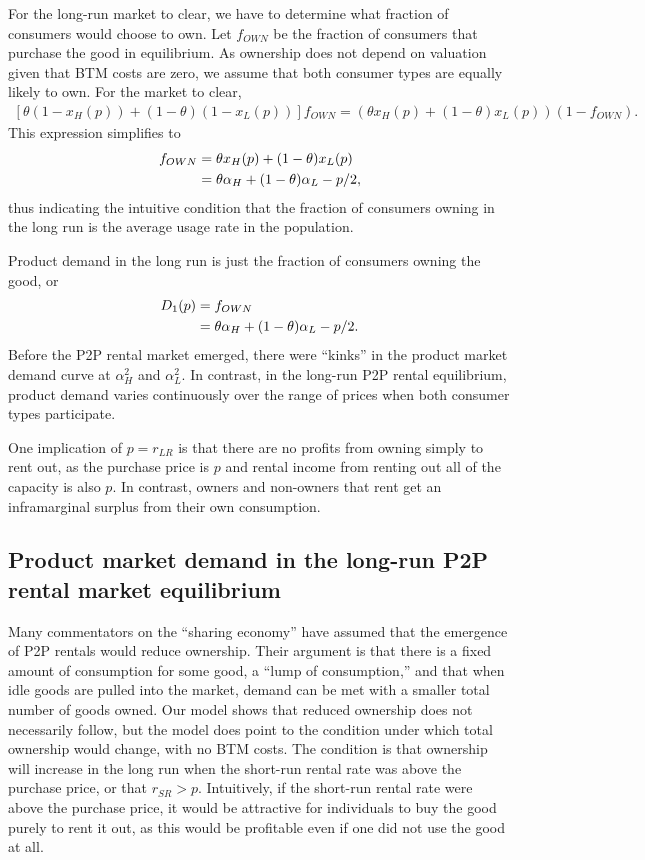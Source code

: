 \documentclass[11pt]{article}
\begin{document}
For the long-run market to clear, we have to determine what fraction of consumers would choose to own. 
Let $f_{OWN}$ be the fraction of consumers that purchase the good in equilibrium. 
As ownership does not depend on valuation given that BTM costs are zero, we assume that both consumer types are equally likely to own. 
For the market to clear, 
\begin{align}
\left[ \theta (1-x_H(p)) + (1-\theta)(1-x_L(p))\right]f_{OWN} = \left(\theta x_H(p) + (1-\theta)x_L(p) \right)(1- f_{OWN}). 
\end{align} 
This expression simplifies to 
\begin{align}
  f_{OWN} &= \theta x_H(p) + (1-\theta)x_L(p) \notag \\
         &= \theta \alpha_H + (1 - \theta) \alpha_L- p/2,
\end{align} 
thus indicating the intuitive condition that the fraction of consumers owning in the long run is the average usage rate in the population.  

Product demand in the long run is just the fraction of consumers owning the good, or 
\begin{align}
D_1(p) &= f_{OWN} \notag \\  
     &= \theta \alpha_H + (1-\theta) \alpha_L - p/2.  
\end{align} 
Before the P2P rental market emerged, there were ``kinks'' in the product market demand curve at $\alpha_H^2$ and $\alpha_L^2$. 
In contrast, in the long-run P2P rental equilibrium, product demand varies continuously over the range of prices when both consumer types participate.

One implication of $p = r_{LR}$ is that there are no profits from owning simply to rent out, as the purchase price is $p$ and rental income from renting out all of the capacity is also $p$.  
In contrast, owners and non-owners that rent get an inframarginal surplus from their own consumption. 

\subsection{Product market demand in the long-run P2P rental market equilibrium} 

Many commentators on the ``sharing economy'' have assumed that the emergence of P2P rentals would reduce ownership. 
Their argument is that there is a fixed amount of consumption for some good, a ``lump of consumption,'' and that when idle goods are pulled into the market, demand can be met with a smaller total number of goods owned.
Our model shows that reduced ownership does not necessarily follow, but the model does point to the condition under which total ownership would change, with no BTM costs.
The condition is that ownership will increase in the long run when the short-run rental rate was above the purchase price, or that $r_{SR} > p$. 
Intuitively, if the short-run rental rate were above the purchase price, it would be attractive for individuals to buy the good purely to rent it out, as this would be profitable even if one did not use the good at all.
\end{document}

